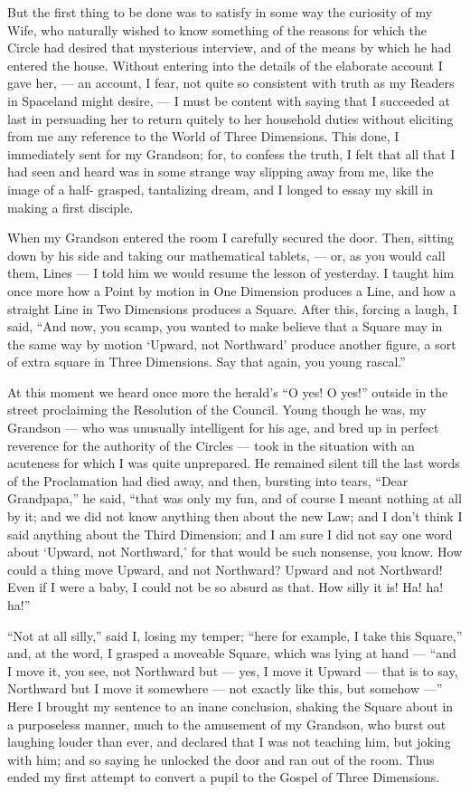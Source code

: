 \documentclass[12pt, a4paper, oneside]{memoir}
\begin{document}
But the first thing to be done was to satisfy in some way the curiosity of my
Wife, who naturally wished to know something of the reasons for which the
Circle had desired that mysterious interview, and of the means by which he had
entered the house. Without entering into the details of the elaborate account
I gave her, --- an account, I fear, not quite so consistent with truth as my
Readers in Spaceland might desire, --- I must be content with saying that I
succeeded at last in persuading her to return quitely to her household duties
without eliciting from me any reference to the World of Three Dimensions. This
done, I immediately sent for my Grandson; for, to confess the truth, I felt
that all that I had seen and heard was in some strange way slipping away from
me, like the image of a half- grasped, tantalizing dream, and I longed to
essay my skill in making a first disciple.

When my Grandson entered the room I carefully secured the door. Then, sitting
down by his side and taking our mathematical tablets, --- or, as you would call
them, Lines --- I told him we would resume the lesson of yesterday. I taught him
once more how a Point by motion in One Dimension produces a Line, and how a
straight Line in Two Dimensions produces a Square. After this, forcing a
laugh, I said, ``And now, you scamp, you wanted to make believe that a Square
may in the same way by motion `Upward, not Northward' produce another figure,
a sort of extra square in Three Dimensions. Say that again, you young rascal.''

At this moment we heard once more the herald's ``O yes! O yes!'' outside in the
street proclaiming the Resolution of the Council. Young though he was, my
Grandson --- who was unusually intelligent for his age, and bred up in perfect
reverence for the authority of the Circles --- took in the situation with an
acuteness for which I was quite unprepared. He remained silent till the last
words of the Proclamation had died away, and then, bursting into tears, ``Dear
Grandpapa,'' he said, ``that was only my fun, and of course I meant nothing at
all by it; and we did not know anything then about the new Law; and I don't
think I said anything about the Third Dimension; and I am sure I did not say
one word about `Upward, not Northward,' for that would be such nonsense, you
know. How could a thing move Upward, and not Northward? Upward and not
Northward! Even if I were a baby, I could not be so absurd as that. How silly
it is! Ha! ha! ha!''

``Not at all silly,'' said I, losing my temper; ``here for example, I take this
Square,'' and, at the word, I grasped a moveable Square, which was lying at
hand --- ``and I move it, you see, not Northward but --- yes, I move it Upward ---
that is to say, Northward but I move it somewhere --- not exactly like this, but
somehow ---'' Here I brought my sentence to an inane conclusion, shaking the
Square about in a purposeless manner, much to the amusement of my Grandson,
who burst out laughing louder than ever, and declared that I was not teaching
him, but joking with him; and so saying he unlocked the door and ran out of
the room. Thus ended my first attempt to convert a pupil to the Gospel of
Three Dimensions.
\end{document}

